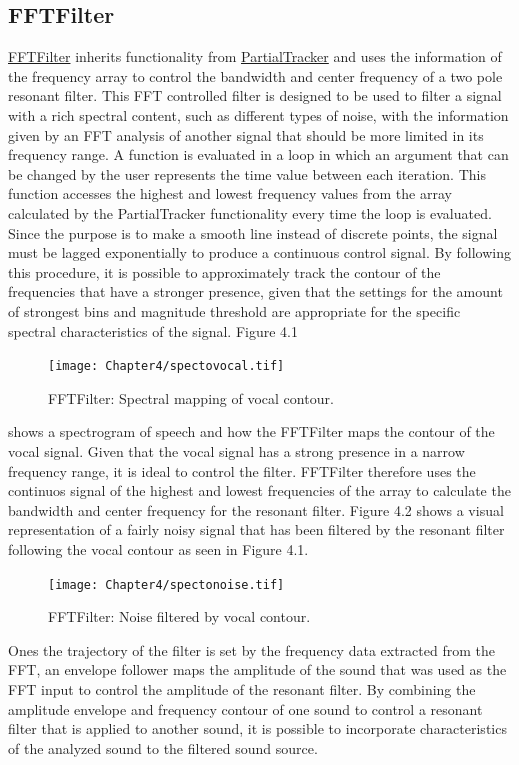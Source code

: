 \subsection{FFTFilter}

\href{http://github.com/freuben/FedeLib/blob/master/PartialTracking/PartialTracker.sc}{FFTFilter} inherits functionality from \hyperlink{partrack}{PartialTracker} and uses the information of the frequency array to control the bandwidth and center frequency of a two pole resonant filter. This FFT controlled filter is designed to be used to filter a signal with a rich spectral content, such as different types of noise, with the information given by an FFT analysis of another signal that should be more limited in its frequency range. A function is evaluated in a loop in which an argument that can be changed by the user represents the time value between each iteration. This function accesses the highest and lowest frequency values from the array calculated by the PartialTracker functionality every time the loop is evaluated. Since the purpose is to make a smooth line instead of discrete points, the signal must be lagged exponentially to produce a continuous control signal. By following this procedure, it is possible to approximately track the contour of the frequencies that have a stronger presence, given that the settings for the amount of strongest bins and magnitude threshold are appropriate for the specific spectral characteristics of the signal. Figure 4.1 
\begin{figure}[htbp] %
   \centering
   \texttt{[image: Chapter4/spectovocal.tif]} %
   \caption{FFTFilter: Spectral mapping of vocal contour.}
   \label{fig:example}
\end{figure}
shows a spectrogram of speech and how the FFTFilter maps the contour of the vocal signal. Given that the vocal signal has a strong presence in a narrow frequency range, it is ideal to control the filter. FFTFilter therefore uses the continuos signal of the highest and lowest frequencies of the array to calculate the bandwidth and center frequency for the resonant filter. Figure 4.2 shows a visual representation of a fairly noisy signal that has been filtered by the resonant filter following the vocal contour as seen in Figure 4.1. 
\begin{figure}[htbp] %
   \centering
   \texttt{[image: Chapter4/spectonoise.tif]} %
   \caption{FFTFilter: Noise filtered by vocal contour.}
   \label{fig:example}
\end{figure}
Ones the trajectory of the filter is set by the frequency data extracted from the FFT, an envelope follower maps the amplitude of the sound that was used as the FFT input to control the amplitude of the resonant filter. By combining the amplitude envelope and frequency contour of one sound to control a resonant filter that is applied to another sound, it is possible to incorporate characteristics of the analyzed sound to the filtered sound source.

